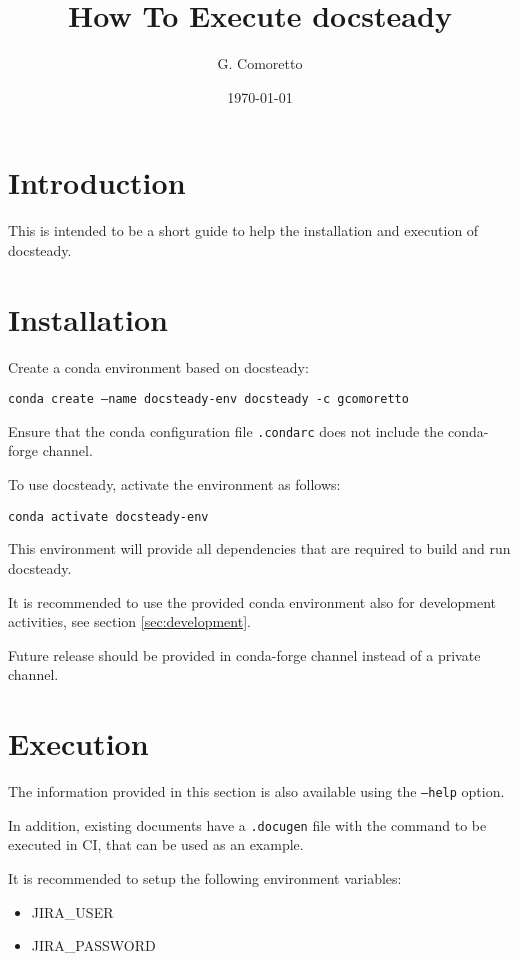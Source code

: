 \documentclass[DM]{lsstdoc}
\author{G. Comoretto}
\begin{document}
\date{\today}

\title{How To Execute docsteady}
\mkshorttitle

\section{Introduction}

This is intended to be a short guide to help the installation and  execution of docsteady.


\section{Installation}\label{sec:install}

Create a conda environment based on docsteady:

\texttt{conda create --name docsteady-env docsteady -c gcomoretto}

Ensure that the conda configuration file  \texttt{.condarc} does not include the conda-forge channel.

To use docsteady, activate the environment as follows:

\texttt{conda activate docsteady-env}

This environment will provide all dependencies that are required to build and run docsteady.

It is recommended to use the provided conda environment also for development activities, see section \ref{sec:development}.

Future release should be provided in conda-forge channel instead of a private channel.



\section{Execution}

The information provided in this section is also available using the \texttt{--help} option.

In addition, existing documents have a \texttt{.docugen} file with the command to be executed in CI, that can be used as an example.

It is recommended to setup the following environment variables:

\begin{itemize}
\item JIRA\_USER
\item JIRA\_PASSWORD
\end{itemize}
\end{document}
